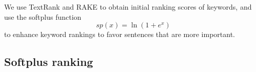 \documentclass[a4paper,twoside]{article}
\begin{document}
\begin{comment}
Our goal is to be able to compress sentences so we can pack more information into a summary. We use the Dependency tree compression model (DTCM) in Shao and Wang ~\shortcite{Shao:16} to do compressions. A dependency tree can provide relations between each word in the sentence. We use the Standord Dependency Parser (SDP) \footnote{\tt http://nlp.stanford.edu/software/\\ \-\hspace{.75cm} stanford-dependencies.shtml} to obtain grammatical relations between words in a sentence. This model follows a set of empirical rules to specify what can or cannot be trimmed. DTCM can delete all the unnecessary branches from sematic aspects. Figure \ref{fig:fig1}shows one example sentence ``Market concerns about the deficit has hit the greenback'' . The compressed sentence is ``Market concerns about deficit hit greenback''.
\end{comment}

\noindent We use TextRank and RAKE to obtain initial ranking scores of keywords, and
use the softplus function \cite{softplus}
\begin{equation}\label{eq1}
sp(x) = \ln (1+e^x)
\end{equation}
to
enhance keyword rankings to favor sentences that are more important. %

\subsection{Softplus ranking}
\end{document}
